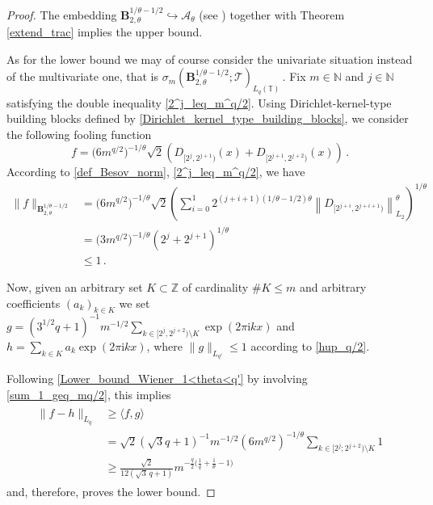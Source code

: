 \documentclass[11pt,reqno]{article}
\numberwithin{equation}{section}
\theoremstyle{definition}
\theoremstyle{plain}
\newcommand{\N}{\ensuremath{\mathbb{N}}}
\newcommand{\zz}{\ensuremath{\mathbb{Z}}}
\newcommand{\tor}{\ensuremath{\mathbb{T}}}
\newcommand{\ca}{\ensuremath{\mathcal A}}
\begin{document}
 \begin{proof} 
The embedding 
$\mathbf{B}^{1/\theta-1/2}_{2,\theta} \hookrightarrow \ca_\theta$ (see  \cite[Thm.\ 5.3]{MSU25}) together with Theorem \ref{extend_trac} implies the upper bound. 


As for the lower bound we may of course consider the univariate situation instead of the multivariate one, that is 
$\sigma_{m} (\mathbf{B}^{1/\theta-1/2}_{2,\theta};\mathcal{T})_{L_q(\tor)}\,.$ Fix $m\in \N$ and $j \in \N$ satisfying the double inequality \eqref{2^j_leq_m^q/2}. Using Dirichlet-kernel-type building blocks defined by \eqref{Dirichlet_kernel_type_building_blocks},  
we consider the following fooling function
 $$
    f = \big(6m^{q/2}\big)^{-1/\theta} \sqrt{2} 
    \left(D_{[2^{j},2^{j+1})} (x) 
    + 
    D_{[2^{j+1},2^{j+2})} (x) \right) \, . 
 $$ 
 According to \eqref{def_Besov_norm}, \eqref{2^j_leq_m^q/2}, we have
\begin{equation} 
    \begin{split} 
 \|f\|_{\mathbf{B}^{1/\theta-1/2}_{2,\theta}} & = \big(6m^{q/2}\big)^{-1/\theta}  \sqrt{2} \left(\sum\limits_{i=0}^{1}2^{(j+i+1)(1/\theta-1/2)\theta} \left\|D_{[2^{j+i},2^{j+i+1})}\right\|_{L_{2}}^{\theta} \right)^{1/\theta}
 \\
 & = \big(3m^{q/2}\big)^{-1/\theta} ( 2^{j} + 2^{j+1} )^{1/\theta}
 \\
 & \leq 1 \, . 
    \end{split}
\end{equation}

Now, given an arbitrary set \(K \subset \zz\) of cardinality \(\# K \leq m\) and arbitrary coefficients \((a_k)_{k \in K}\) we set \(g =  (3^{1/2} q + 1)^{-1} m^{-1/2} \sum_{k \in [2^j, 2^{j+2}) \setminus K} \exp(2 \pi \mathrm{i} k x) \) and \(h =  \sum_{k \in K} a_{k} \exp(2 \pi \mathrm{i} k x)\), where $\|g\|_{L_{q'}}\leq 1$ according to \eqref{hup_q/2}.  

 Following \eqref{Lower_bound_Wiener_1<theta<q'} by involving \eqref{sum_1_geq_mq/2}, this implies 
\begin{align}\label{Lower_bound_Besov_1<theta<q'}  
  \begin{split}
 \|f - h\|_{L_q}  & \geq \langle f,g \rangle \\
& = \sqrt{2} (\sqrt{3} q + 1)^{-1} m^{-1/2} (6m^{q/2})^{-1/\theta}  \sum_{k \in  [2^j;  2^{j+2})  \setminus K} 1 \\
  & \geq \frac{\sqrt{2}}{ 12 (\sqrt{3}\, q + 1)}  m^{ -\frac{q}{2}\big(\frac{1}{q}+\frac{1} {\theta}-1\big)} 
   \end{split}
 \end{align}
and, therefore, proves the lower bound.  
 \end{proof} 
\end{document}
